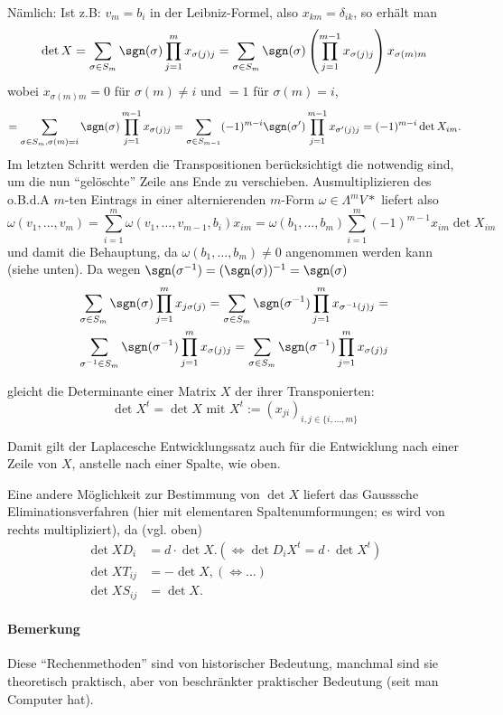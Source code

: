 	Nämlich: Ist z.B: $ v_m=b_i $ in der Leibniz-Formel, also $ x_{km}=\delta_{ik} $, so erhält man
		\[ \det X = \sum_{\sigma\in S_m}\sgn(\sigma)\prod_{j=1}^{m}x_{\sigma(j)j}=\sum_{\sigma\in S_m}\sgn(\sigma)\left(\prod_{j=1}^{m-1}x_{\sigma(j)j}\right)x_{\sigma(m)m} \]
	wobei $ x_{\sigma(m)m} = 0 $ für $ \sigma(m)\neq i $ und $ =1 $ für $ \sigma(m) = i $,
		\[ = \sum_{\sigma\in S_m, \sigma(m)=i}\sgn(\sigma)\prod_{j=1}^{m-1}x_{\sigma(j)j} = \sum_{\sigma\in S_{m-1}}(-1)^{m-i}\sgn(\sigma')\prod_{j=1}^{m-1}x_{\sigma'(j)j} = (-1)^{m-i}\det X_{im}. \]
	Im letzten Schritt werden die Transpositionen berücksichtigt die notwendig sind, um die nun "`gelöschte"' Zeile ans Ende zu verschieben. Ausmultiplizieren des o.B.d.A $ m $-ten Eintrags in einer alternierenden $ m $-Form $ \omega\in \Lambda^mV* $ liefert also 
		\[ \omega(v_1,\dots,v_m) = \sum_{i=1}^{m}\omega(v_1,\dots,v_{m-1},b_i)x_{im} = \omega(b_1,\dots,b_m)\sum_{i=1}^{m}(-1)^{m-1}x_{im}\det X_{im} \]
	und damit die Behauptung, da $ \omega(b_1,\dots,b_m)\neq 0 $ angenommen werden kann (siehe unten).
	Da wegen $ \sgn(\sigma^{-1})=(\sgn(\sigma))^{-1} = \sgn(\sigma) $
		\begin{gather*}
		\sum_{\sigma\in S_m}\sgn(\sigma)\prod_{j=1}^{m}x_{j\sigma(j)} =
		\sum_{\sigma\in S_m} \sgn(\sigma^{-1})\prod_{j=1}^{m}x_{\sigma^{-1}(j)j} =\\
		\sum_{\sigma^{-1}\in S_m} \sgn(\sigma^{-1})\prod_{j=1}^{m}x_{\sigma(j)j} =
		\sum_{\sigma\in S_m} \sgn(\sigma^{-1})\prod_{j=1}^{m}x_{\sigma(j)j}
		\end{gather*}
	\begin{Definition}
		gleicht die Determinante einer Matrix $ X $ der ihrer Transponierten:
		\[ \det X^t = \det X \text{ mit } X^t := (x_{ji})_{i,j\in \{i,\dots, m \}} \]
	\end{Definition}
	Damit gilt der Laplacesche Entwicklungssatz auch für die Entwicklung nach einer Zeile von $ X $, anstelle nach einer Spalte, wie oben.
	
	Eine andere Möglichkeit zur Bestimmung von $ \det X $ liefert das Gausssche Eliminationsverfahren (hier mit elementaren Spaltenumformungen; es wird von rechts multipliziert), da (vgl. oben)
		\begin{align*}
		\det XD_i &= d\cdot \det X. (\Leftrightarrow \det D_iX^t = d\cdot \det X^t)\\
		\det XT_{ij} &= -\det X, (\Leftrightarrow\dots)\\
		\det XS_{ij} &= \det X.
		\end{align*}
\paragraph{Bemerkung}
	Diese "`Rechenmethoden"' sind von historischer Bedeutung, manchmal sind sie theoretisch praktisch, aber von beschränkter praktischer Bedeutung (seit man Computer hat).
